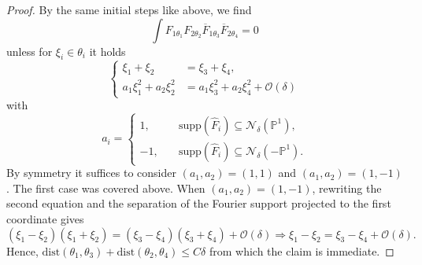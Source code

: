\documentclass{amsart}
\theoremstyle{definition}
\begin{document}
\begin{proof}
By the same initial steps like above, we find
\begin{equation*}
\int F_{1 \theta_1} F_{2 \theta_2} \overline{F}_{1 \theta_3} \overline{F}_{2 \theta_4} = 0
\end{equation*}
unless for $\xi_i \in \theta_i$ it holds
\begin{equation*}
\left\{ \begin{array}{cl}
\xi_1 + \xi_2 &= \xi_3 + \xi_4, \\
a_1 \xi_1^2 + a_2 \xi_2^2 &= a_1 \xi_3^2 + a_2 \xi_4^2 + \mathcal{O}(\delta)
\end{array} \right.
\end{equation*}
with
\begin{equation*}
a_i = \begin{cases}
1, &\quad \text{supp}(\hat{F}_i) \subseteq \mathcal{N}_{\delta}(\mathbb{P}^1), \\
-1, &\quad \text{supp}(\hat{F}_i) \subseteq \mathcal{N}_{\delta}(-\mathbb{P}^1).
\end{cases}
\end{equation*}
By symmetry it suffices to consider $(a_1,a_2) = (1,1)$ and $(a_1,a_2) = (1,-1)$. The first case was covered above.
When $(a_1,a_2)=(1,-1)$, rewriting the second equation and the separation of the Fourier support projected to the first coordinate gives
\begin{equation*}
(\xi_1-\xi_2)(\xi_1+\xi_2) = (\xi_3-\xi_4)(\xi_3+\xi_4) + \mathcal{O}(\delta) \Rightarrow \xi_1 - \xi_2 = \xi_3 - \xi_4 + \mathcal{O}(\delta).
\end{equation*}
Hence, $\text{dist}(\theta_1,\theta_3) + \text{dist}(\theta_2,\theta_4) \leq C \delta$ from which the claim is immediate.
\end{proof}
\end{document}
